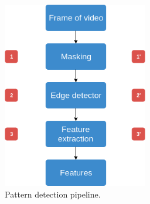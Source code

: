 \documentclass[journal]{IEEEtran}
\begin{document}
\begin{figure}[H]
\centering
\includegraphics[width=2.5in]{_img/algorithm_overview.png}
\caption{Pattern detection pipeline.}
\end{figure}
\end{document}
